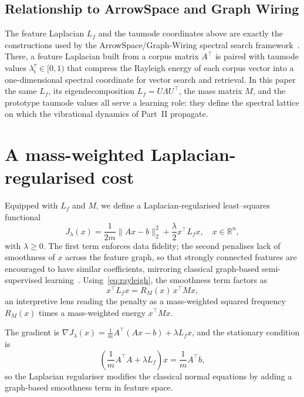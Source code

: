 \documentclass[12pt,a4paper]{article}
\theoremstyle{plain}
\theoremstyle{definition}
\theoremstyle{remark}
\newcommand{\R}{\mathbb{R}}
\newcommand{\1}{\mathbf{1}}
\begin{document}
\subsection{Relationship to ArrowSpace and Graph Wiring}
\label{sec:arrowspace}

The feature Laplacian $L_f$ and the taumode coordinates above are
exactly the constructions used by the ArrowSpace/Graph-Wiring spectral
search framework~\cite{moriondo_arrowspace_2025,moriondo_graphwiring_2026}.
There, a feature Laplacian built from a corpus matrix $A^\top$ is paired
with taumode values $\lambda_i^\tau \in [0,1)$ that compress the Rayleigh
energy of each corpus vector into a one-dimensional spectral coordinate
for vector search and retrieval. In this paper the same $L_f$, its
eigendecomposition $L_f = U\Lambda U^\top$, the mass matrix $M$, and the
prototype taumode values all serve a learning role: they define the
spectral lattice on which the vibrational dynamics of
Part~II propagate.

\section{A mass-weighted Laplacian-regularised cost}
\label{sec:cost}

Equipped with $L_f$ and $M$, we define a Laplacian-regularised
least--squares functional
\begin{equation}
    J_\lambda(x)
    = \frac{1}{2m} \|A x - b\|_2^2
      + \frac{\lambda}{2} x^\top L_f x,
    \quad x \in \R^n,
    \label{eq:laplacian_cost}
\end{equation}
with $\lambda \ge 0$. The first term enforces data fidelity; the second
penalises lack of smoothness of $x$ across the feature graph, so that
strongly connected features are encouraged to have similar coefficients,
mirroring classical graph-based semi-supervised
learning~\cite{zhu_ghahramani_lafferty_2003,belkin_matveeva_niyogi_2004,smola_kondor_2003}.
Using~\eqref{eq:rayleigh}, the smoothness term factors as
\begin{equation}
    x^\top L_f x = R_M(x)\, x^\top M x,
    \label{eq:rayleigh_factorisation}
\end{equation}
an interpretive lens reading the penalty as a mass-weighted squared
frequency $R_M(x)$ times a mass-weighted energy $x^\top M x$.

The gradient is
$\nabla J_\lambda(x) = \frac{1}{m} A^\top (A x - b) + \lambda L_f x$,
and the stationary condition is
\begin{equation}
    \left( \frac{1}{m} A^\top A + \lambda L_f \right) x
    = \frac{1}{m} A^\top b,
    \label{eq:laplacian_normal}
\end{equation}
so the Laplacian regulariser modifies the classical normal equations by
adding a graph-based smoothness term in feature space.
\end{document}
